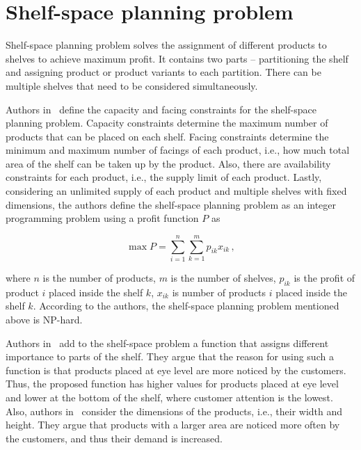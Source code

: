 \section{Shelf-space planning problem}\label{sec:shelf-space-planning}

Shelf-space planning problem solves the assignment of different products to shelves to achieve maximum profit.
It contains two parts – partitioning the shelf and assigning product or product variants to each partition.
There can be multiple shelves that need to be considered simultaneously.~\cite{bianchi-aguiarRetailShelfSpace2021}

Authors in~\cite{yangStudyShelfSpace1999} define the capacity and facing constraints for the shelf-space planning problem.
Capacity constraints determine the maximum number of products that can be placed on each shelf.
Facing constraints determine the minimum and maximum number of facings of each product, i.e., how much total area of the shelf can be taken up by the product.
Also, there are availability constraints for each product, i.e., the supply limit of each product.
Lastly, considering an unlimited supply of each product and multiple shelves with fixed dimensions,
the authors define the shelf-space planning problem as an integer programming problem using a profit function $P$ as

\begin{equation}
    \max P = \sum\limits_{i=1}^n\sum\limits_{k=1}^mp_{ik} x_{ik}\,,
    \label{eq:shelf-space-planning}
\end{equation}

where $n$ is the number of products, $m$ is the number of shelves, $p_{ik}$ is the profit of product $i$ placed inside the shelf $k$, $x_{ik}$
is number of products $i$ placed inside the shelf $k$.
According to the authors, the shelf-space planning problem mentioned above is NP-hard.

Authors in~\cite{hwangGeneticAlgorithmApproach2009} add to the shelf-space problem a function that assigns
different importance to parts of the shelf.
They argue that the reason for using such a function is that products placed at eye level are more noticed by the customers.
Thus, the proposed function has higher values for products placed at eye level and lower at the bottom of the shelf,
where customer attention is the lowest.
Also, authors in~\cite{hubnerMaximizingProfitAssortment2020} consider the dimensions of the products, i.e., their width and height.
They argue that products with a larger area are noticed more often by the customers, and thus their demand is increased.

